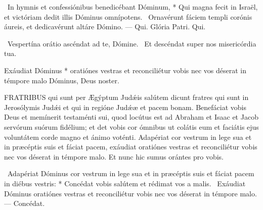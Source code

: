 \R\ In hymnis et confessiónibus benedicébant Dóminum, * Qui magna fecit in Israël, et victóriam dedit illis Dóminus omnípotens. \V\ Ornavérunt fáciem templi corónis áureis, et dedicavérunt altáre Dómino. — Qui. Glória Patri. Qui.


\V\ Vespertína orátio ascéndat ad te, Dómine. \R\ Et descéndat super nos misericórdia tua.

 Exáudiat Dóminus * oratiónes vestras et reconciliétur vobis nec vos déserat in témpore malo Dóminus, Deus noster.







\lettrine[lines=2]{F}{RATRIBUS} qui sunt per Ægýptum Judǽis salútem dicunt fratres qui sunt in Jerosólymis Judǽi et qui in regióne Judǽæ et pacem bonam. Benefáciat vobis Deus et memínerit testaménti sui, quod locútus est ad Abraham et Isaac et Jacob servórum suórum fidélium; et det vobis cor ómnibus ut colátis eum et faciátis ejus voluntátem corde magno et ánimo voténti. Adapériat cor vestrum in lege sua et in præcéptis suis et fáciat pacem, exáudiat oratiónes vestras et reconciliétur vobis nec vos déserat in témpore malo. Et nunc hic sumus orántes pro vobis.

\R\ Adapériat Dóminus cor vestrum in lege sua et in præcéptis suis et fáciat pacem in diébus vestris: * Concédat vobis salútem et rédimat vos a malis. \V\ Exáudiat Dóminus oratiónes vestras et reconciliétur vobis nec vos déserat in témpore malo. — Concédat.


